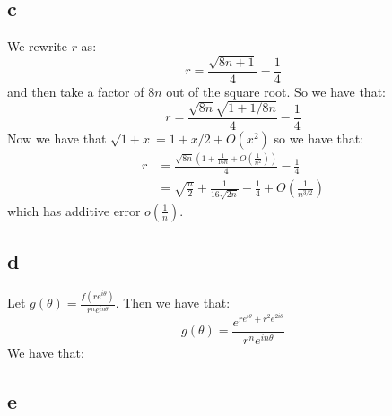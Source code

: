\documentclass[]{article}
\begin{document}
\subsection{c}
We rewrite $r$ as:
\begin{equation}
	r = \frac{\sqrt{8n + 1}}{4} - \frac{1}{4}
\end{equation}
and then take a factor of $8n$ out of the square root. So we have that:
\begin{equation}
	r = \frac{\sqrt{8n}\sqrt{1+ 1/8n}}{4} - \frac{1}{4}
\end{equation}
Now we have that $\sqrt{1 + x} = 1 + x/2 + O(x^2)$ so we have that:
\begin{align*}
	r &= \frac{\sqrt{8n}\left(1 + \frac{1}{16n} + O(\frac{1}{n^2})\right)}{4} - \frac{1}{4}\\
	&= \sqrt{\frac{n}{2}} + \frac{1}{16 \sqrt{2 n}} - \frac{1}{4} + O(\frac{1}{n^{3/2}})
\end{align*}
which has additive error $o(\frac{1}{n})$. 

\subsection{d}
Let $g(\theta) = \frac{f(r e^{i \theta})}{r^n e^{i n \theta}}$. Then we have that:
\begin{equation}
	g(\theta) = \frac{ e^{r e^{i \theta} + r^2 e^{2 i \theta}}}{r^n e^{i n \theta}}
\end{equation}
We have that:

\subsection{e}
\end{document}
